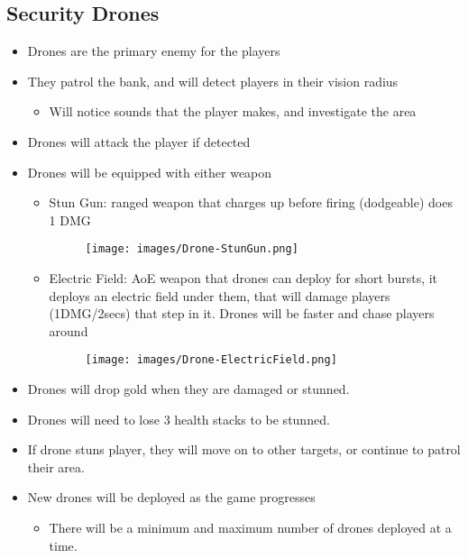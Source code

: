 \documentclass[10pt]{report}
\begin{document}
\subsection{Security Drones}

\begin{itemize}
    \item Drones are the primary enemy for the players
    \item They patrol the bank, and will detect players in their vision radius
    \begin{itemize}
        \item Will notice sounds that the player makes, and investigate the area 
    \end{itemize}
    \item Drones will attack the player if detected
    \item Drones will be equipped with either weapon                    
    \begin{itemize}
        \item Stun Gun: ranged weapon that charges up before firing (dodgeable) does 1 DMG
        \begin{figure}[H]
            \centering
            \texttt{[image: images/Drone-StunGun.png]}
        \end{figure}
        \item Electric Field: AoE weapon that drones can deploy for short bursts, it deploys an electric field under them, that will damage  players (1DMG/2secs) that step in it. Drones will be faster and chase players around
        \begin{figure}[H]
            \centering
            \texttt{[image: images/Drone-ElectricField.png]}
        \end{figure}
    \end{itemize}
    \item Drones will drop gold when they are damaged or stunned.
    \item Drones will need to lose 3 health stacks to be stunned.
    \item If drone stuns player, they will move on to other targets, or continue to patrol their area.
    \item New drones will be deployed as the game progresses
    \begin{itemize}
        \item There will be a minimum and maximum number of drones deployed at a time.
    \end{itemize}
\end{itemize}
\end{document}
